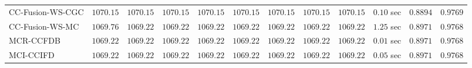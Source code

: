 \begin{table}[H]
\begin{tabular}{lrrrrrrrrrrr}
    CC-Fusion-WS-CGC & $      1070.15$ & $      1070.15$ & $      1070.15$ & $      1070.15$ & $      1070.15$ & $      1070.15$ & $      1070.15$ & $      1070.15$ & $         0.10$ sec    & $       0.8894$  & $       0.9769$ \\ 
     CC-Fusion-WS-MC & $      1069.76$ & $      1069.22$ & $      1069.22$ & $      1069.22$ & $      1069.22$ & $      1069.22$ & $      1069.22$ & $      1069.22$ & $         1.25$ sec    & $       0.8971$  & $       0.9768$ \\ 
\cmidrule{1-1} 
           MCR-CCFDB & $      1069.22$ & $      1069.22$ & $      1069.22$ & $      1069.22$ & $      1069.22$ & $      1069.22$ & $      1069.22$ & $      1069.22$ & $         0.01$ sec    & $       0.8971$  & $       0.9768$ \\ 
\cmidrule{1-1} 
           MCI-CCIFD & $      1069.22$ & $      1069.22$ & $      1069.22$ & $      1069.22$ & $      1069.22$ & $      1069.22$ & $      1069.22$ & $      1069.22$ & $         0.05$ sec    & $       0.8971$  & $       0.9768$ \\ 
\bottomrule
\end{tabular}
\end{table}

